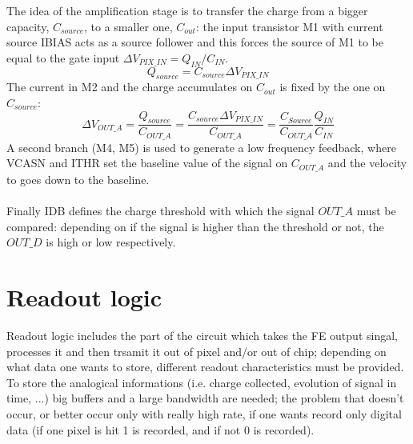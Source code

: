       The idea of the amplification stage is to transfer the charge from a bigger capacity\cite{ALPIDE-FE}, $C_{source}$, to a smaller one, $C_{out}$: the input transistor M1 with current source IBIAS acts as a source follower and this forces the source of M1 to be equal to the gate input  $\Delta V_{PIX\_IN} = Q_{IN}/C_{IN}$.
      \begin{equation}
         Q_{source} = C_{source} \Delta V_{PIX\_IN}
      \end{equation}
      The current in M2 and the charge accumulates on $C_{out}$ is fixed by the one on $C_{source}$:
      \begin{equation}
         \Delta V_{OUT\_A} = \frac{Q_{source}}{C_{OUT\_A}} = \frac{C_{source}\Delta V_{PIX\_IN}}{C_{OUT\_A}}  = \frac{C_{Source}}{C_{OUT\_A}}\frac{Q_{IN}}{C_{IN}}
      \end{equation}
      A second branch (M4, M5) is used to generate a low frequency feedback, where VCASN and ITHR set the baseline value of the signal on $C_{OUT\_A}$ and the velocity to goes down to the baseline.\\
      \\
      Finally IDB defines the charge threshold with which the signal $OUT\_A$ must be compared: depending on if the signal is higher than the threshold or not, the $OUT\_D$ is high or low respectively.
      
\section{Readout logic}
   Readout logic includes the part of the circuit which takes the FE output singal, processes it and then trsamit it out of pixel and/or out of chip; depending on what data one wants to store, different readout characteristics must be provided. \\
   To store the analogical informations (i.e. charge collected, evolution of signal in time, ...) big buffers and a large bandwidth are needed; the problem that doesn't occur, or better occur only with really high rate, if one wants record only digital data (if one pixel is hit 1 is recorded, and if not 0 is recorded). 

